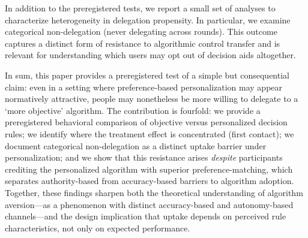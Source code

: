\documentclass[a4paper, 12pt, fleqn]{article}
\theoremstyle{definition}
\newcommand{\inew}[1]{{\color{blue} #1\color{black}}}
\begin{document}
In addition to the preregistered tests, we report a small set of analyses to characterize heterogeneity in delegation propensity. In particular, we examine categorical non-delegation (never delegating across rounds). This outcome captures a distinct form of resistance to algorithmic control transfer and is relevant for understanding which users may opt out of decision aids altogether.

In sum, this paper provides a preregistered test of a simple but consequential claim: even in a setting where preference-based personalization may appear normatively attractive, people may nonetheless be more willing to delegate to a `more objective' algorithm. \inew{The contribution is fourfold: we provide a preregistered behavioral comparison of objective versus personalized decision rules; we identify where the treatment effect is concentrated (first contact); we document categorical non-delegation as a distinct uptake barrier under personalization; and we show that this resistance arises \emph{despite} participants crediting the personalized algorithm with superior preference-matching, which separates authority-based from accuracy-based barriers to algorithm adoption. Together, these findings sharpen both the theoretical understanding of algorithm aversion---as a phenomenon with distinct accuracy-based and autonomy-based channels---and the design implication that uptake depends on perceived rule characteristics, not only on expected performance.}
\end{document}
